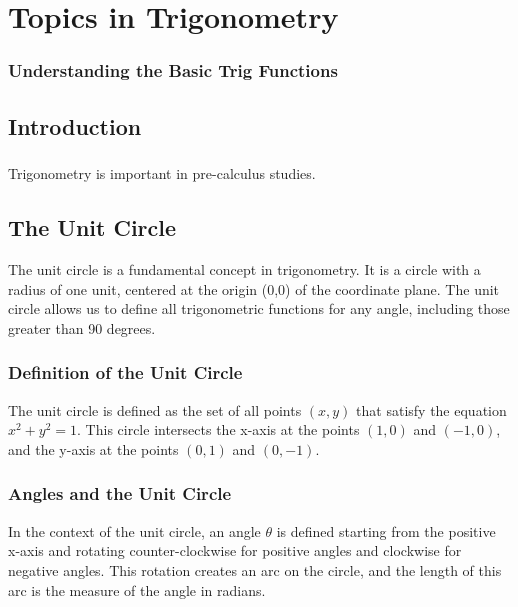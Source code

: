 \documentclass[a4paper,12pt]{book}
\begin{document}

\chapter{Topics in Trigonometry}
\subsection*{Understanding the Basic Trig Functions}

\section*{Introduction}
\paragraph{}
Trigonometry is important in pre-calculus studies.

\section{The Unit Circle}
\label{sec:unit_circle}

The unit circle is a fundamental concept in trigonometry. It is a circle with a radius of one unit, centered at the origin (0,0) of the coordinate plane. The unit circle allows us to define all trigonometric functions for any angle, including those greater than 90 degrees.

\subsection{Definition of the Unit Circle}
\label{subsec:unit_circle_definition}

The unit circle is defined as the set of all points \((x, y)\) that satisfy the equation \(x^2 + y^2 = 1\). This circle intersects the x-axis at the points \((1, 0)\) and \((-1, 0)\), and the y-axis at the points \((0, 1)\) and \((0, -1)\).

\subsection{Angles and the Unit Circle}
\label{subsec:angles_unit_circle}

In the context of the unit circle, an angle \(\theta\) is defined starting from the positive x-axis and rotating counter-clockwise for positive angles and clockwise for negative angles. This rotation creates an arc on the circle, and the length of this arc is the measure of the angle in radians.
\end{document}
